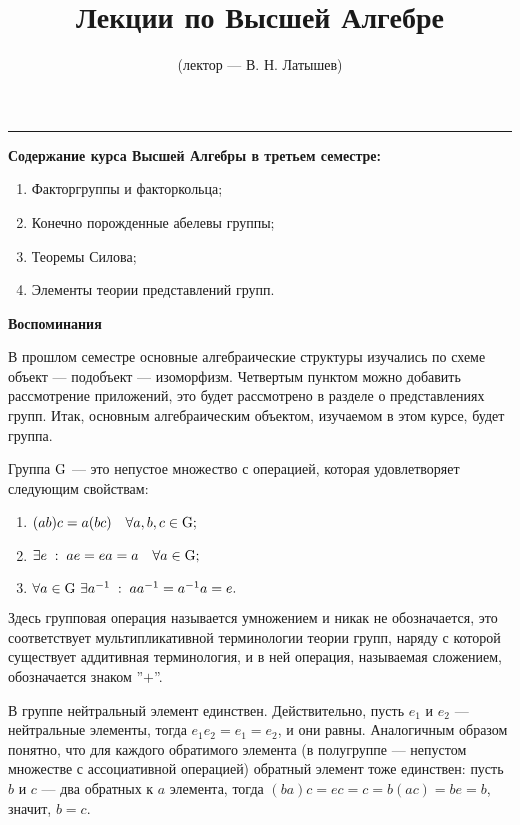 \title{Лекции по Высшей Алгебре}
\author{(лектор --- В. Н. Латышев)}
\maketitle
\hrule
\rule{0pt}{20pt}
\par{\bf Содержание курса Высшей Алгебры в третьем семестре:}
\begin{enumerate}
    \item Факторгруппы и факторкольца;
    \item Конечно порожденные абелевы группы;
    \item Теоремы Силова;
    \item Элементы теории представлений групп.
\end{enumerate}
\par
\centerline{\bf Воспоминания}
\par\rule{0pt}{20pt}
В прошлом семестре основные алгебраические структуры изучались по схеме объект --- подобъект --- изоморфизм.
Четвертым пунктом можно добавить рассмотрение приложений, это
будет рассмотрено в разделе о представлениях групп. Итак, основным
алгебраическим объектом, изучаемом в этом курсе, будет группа.
\par\de Группа ${\rm G}$ --- это непустое множество с операцией, которая удовлетворяет следующим свойствам:
\begin{enumerate}
    \item $(ab)c=a(bc)\quad\forall a,b,c\in {\rm G};$
    \item $\exists e\;:\; ae=ea=a\quad\forall a\in {\rm G};$
    \item $\forall a\in{\rm G}\ \exists a^{-1}\;:\; aa^{-1}=a^{-1}a=e.$
\end{enumerate}
\par Здесь групповая операция называется умножением и никак не обозначается, это соответствует мультипликативной терминологии
теории групп, наряду с которой существует аддитивная терминология, и в ней операция, называемая сложением, обозначается знаком ''$+$''.
\par В группе нейтральный элемент единствен. Действительно, пусть $e_1$ и $e_2$ --- нейтральные элементы, тогда $e_1e_2=e_1=e_2$, и они равны.
Аналогичным образом понятно, что для каждого обратимого элемента (в полугруппе --- непустом множестве с ассоциативной операцией) обратный
элемент тоже единствен: пусть $b$ и $c$ --- два обратных к $a$ элемента, тогда
$(ba)c=ec=c=b(ac)=be=b$, значит, $b=c$.
